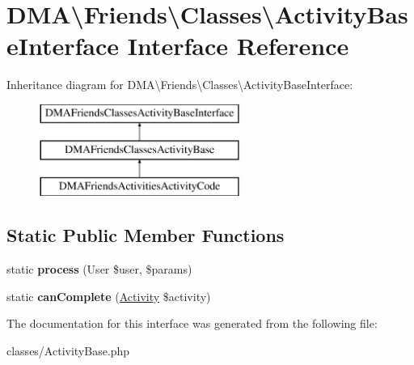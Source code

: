 \hypertarget{interfaceDMA_1_1Friends_1_1Classes_1_1ActivityBaseInterface}{\section{D\+M\+A\textbackslash{}Friends\textbackslash{}Classes\textbackslash{}Activity\+Base\+Interface Interface Reference}
\label{interfaceDMA_1_1Friends_1_1Classes_1_1ActivityBaseInterface}
}
Inheritance diagram for D\+M\+A\textbackslash{}Friends\textbackslash{}Classes\textbackslash{}Activity\+Base\+Interface\+:\begin{figure}[H]
\begin{center}
\leavevmode
\includegraphics[height=3.000000cm]{d6/d4a/interfaceDMA_1_1Friends_1_1Classes_1_1ActivityBaseInterface}
\end{center}
\end{figure}
\subsection*{Static Public Member Functions}
\begin{DoxyCompactItemize}
\item 
\hypertarget{interfaceDMA_1_1Friends_1_1Classes_1_1ActivityBaseInterface_a5769d758052b6158267da8470fc46096}{static {\bfseries process} (User \$user, \$params)}\label{interfaceDMA_1_1Friends_1_1Classes_1_1ActivityBaseInterface_a5769d758052b6158267da8470fc46096}

\item 
\hypertarget{interfaceDMA_1_1Friends_1_1Classes_1_1ActivityBaseInterface_a8e9c9046f3a6be3e2cbe57f3f3bfa550}{static {\bfseries can\+Complete} (\hyperlink{classDMA_1_1Friends_1_1Models_1_1Activity}{Activity} \$activity)}\label{interfaceDMA_1_1Friends_1_1Classes_1_1ActivityBaseInterface_a8e9c9046f3a6be3e2cbe57f3f3bfa550}

\end{DoxyCompactItemize}


The documentation for this interface was generated from the following file\+:\begin{DoxyCompactItemize}
\item 
classes/Activity\+Base.\+php\end{DoxyCompactItemize}
